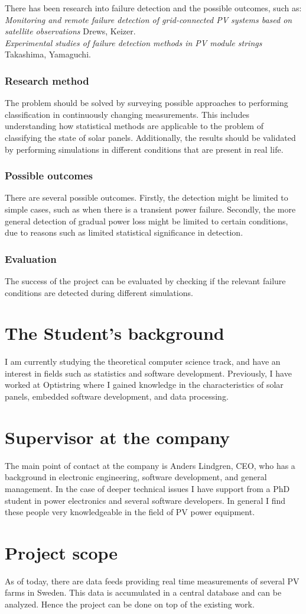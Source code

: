 \documentclass[a4paper,11pt]{article}
\begin{document}
There has been research into failure detection and the possible outcomes, such as: \\

\noindent
\emph{Monitoring and remote failure detection of grid-connected PV systems based on satellite observations} Drews, Keizer.\\
\noindent
\emph{Experimental studies of failure detection methods in PV module strings} Takashima, Yamaguchi.

\subsubsection*{Research method}
The problem should be solved by surveying possible approaches to performing classification in continuously changing measurements.
This includes understanding how statistical methods are applicable to the problem of classifying the state of solar panels.
Additionally, the results should be validated by performing simulations in different conditions that are present in real life.

\subsubsection*{Possible outcomes}
There are several possible outcomes. Firstly, the detection might be limited to simple cases, such as when there is a transient power failure.
Secondly, the more general detection of gradual power loss might be limited to certain conditions, due to reasons such as limited statistical significance in detection.

\subsubsection*{Evaluation}
The success of the project can be evaluated by checking if the relevant failure conditions are detected during different simulations.

\section*{The Student's background}
I am currently studying the theoretical computer science track, and have an interest in fields such as statistics and software development.
Previously, I have worked at Optistring where I gained knowledge in the characteristics of solar panels, embedded software development, and data processing.

\section*{Supervisor at the company}
The main point of contact at the company is Anders Lindgren, CEO, who has a background in electronic engineering, software development, and general management.
In the case of deeper technical issues I have support from a PhD student in power electronics and several software developers.
In general I find these people very knowledgeable in the field of PV power equipment.

\section*{Project scope}
As of today, there are data feeds providing real time measurements of several PV farms in Sweden.
This data is accumulated in a central database and can be analyzed.
Hence the project can be done on top of the existing work.
\end{document}
